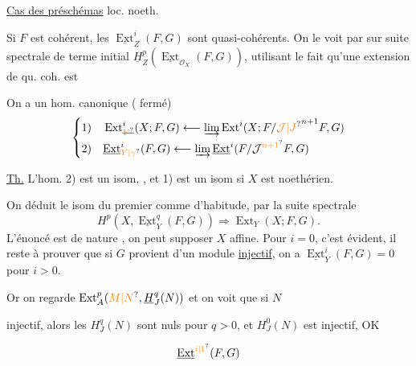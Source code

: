 \uline{Cas des préschémas} loc. noeth.

Si $F$ est cohérent, les $\underline{\operatorname{Ext}}^i_Z(F,G)$ sont quasi-cohérents. On le voit par  sur  suite spectrale de terme initial $\underline{H}^p_Z(\underline{\operatorname{Ext}}_{\mathcal O_X}(F,G))$, utilisant le fait qu'une extension de qu. coh. est  

On a un hom. canonique ( fermé)
\[
\left\{\begin{aligned}
1)\quad &\operatorname{Ext}^i_{\deleted{\unsure{Y}}}(X;F,G)\longleftarrow\varinjlim\operatorname{Ext}^i(X;F/{\unsure{\mathcal J|J}}^{n+1}F,G)\\
2)\quad &\underline{\operatorname{Ext}}^i_{\unsure{Y|\gamma}}(F,G)\longleftarrow\varinjlim\underline{\operatorname{Ext}}^i(F/\mathcal J^{\unsure{n+1}}F,G)
\end{aligned}\right.
\]

\uline{Th.}  L'hom. 2) est un isom, , et 1) est un isom si $X$ est noethérien.

On déduit  le  isom du premier comme d'habitude, par la suite spectrale
\[
H^p(X,\underline{\operatorname{Ext}}^q_Y(F,G))\Longrightarrow\operatorname{Ext}_Y(X;F,G).
\]
L'énoncé est de nature \uline{}, on peut supposer $X$ affine. Pour $i=0$, c'est évident, il reste à  prouver que si $G$ provient d'un module \uline{injectif}, on a $\underline{\operatorname{Ext}}^i_Y(F,G)=0$ pour $i>0$.

Or on regarde $\operatorname{Ext}^p_A(\unsure{M|N},\underline{H}^q_J(N))$ et on voit que si $N$

injectif, alors les $H^q_J(N)$ sont nuls pour $q>0$, et $H^0_J(N)$ est injectif, OK \unsure{----}

\[
\underline{\operatorname{Ext}}^{\unsure{i|1}}(F,G)
\]

